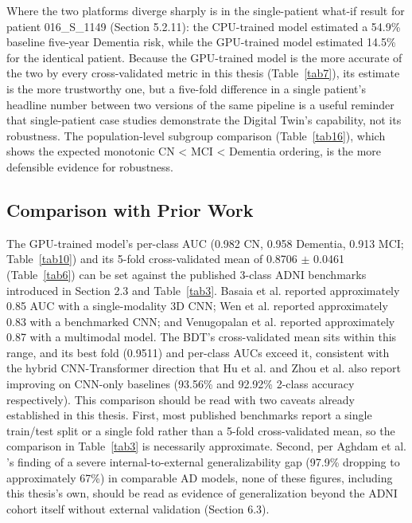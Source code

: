 \documentclass[pdflatex,sn-mathphys-num]{sn-jnl}%
\theoremstyle{thmstyleone}%
\theoremstyle{thmstyletwo}%
\theoremstyle{thmstylethree}%
\begin{document}
Where the two platforms diverge sharply is in the single-patient what-if result for patient 016\_S\_1149 (Section 5.2.11): the CPU-trained model estimated a 54.9\% baseline five-year Dementia risk, while the GPU-trained model estimated 14.5\% for the identical patient. Because the GPU-trained model is the more accurate of the two by every cross-validated metric in this thesis (Table~\ref{tab7}), its estimate is the more trustworthy one, but a five-fold difference in a single patient's headline number between two versions of the same pipeline is a useful reminder that single-patient case studies demonstrate the Digital Twin's capability, not its robustness. The population-level subgroup comparison (Table~\ref{tab16}), which shows the expected monotonic CN < MCI < Dementia ordering, is the more defensible evidence for robustness.

\subsection{Comparison with Prior Work}\label{sec6_2}

The GPU-trained model's per-class AUC (0.982 CN, 0.958 Dementia, 0.913 MCI; Table~\ref{tab10}) and its 5-fold cross-validated mean of 0.8706 $\pm$ 0.0461 (Table~\ref{tab6}) can be set against the published 3-class ADNI benchmarks introduced in Section 2.3 and Table~\ref{tab3}. Basaia et al. \cite{bib12} reported approximately 0.85 AUC with a single-modality 3D CNN; Wen et al. \cite{bib13} reported approximately 0.83 with a benchmarked CNN; and Venugopalan et al. \cite{bib16} reported approximately 0.87 with a multimodal model. The BDT's cross-validated mean sits within this range, and its best fold (0.9511) and per-class AUCs exceed it, consistent with the hybrid CNN-Transformer direction that Hu et al. \cite{bib15} and Zhou et al. \cite{bib28} also report improving on CNN-only baselines (93.56\% and 92.92\% 2-class accuracy respectively). This comparison should be read with two caveats already established in this thesis. First, most published benchmarks report a single train/test split or a single fold rather than a 5-fold cross-validated mean, so the comparison in Table~\ref{tab3} is necessarily approximate. Second, per Aghdam et al. \cite{bib27}'s finding of a severe internal-to-external generalizability gap (97.9\% dropping to approximately 67\%) in comparable AD models, none of these figures, including this thesis's own, should be read as evidence of generalization beyond the ADNI cohort itself without external validation (Section 6.3).
\end{document}
